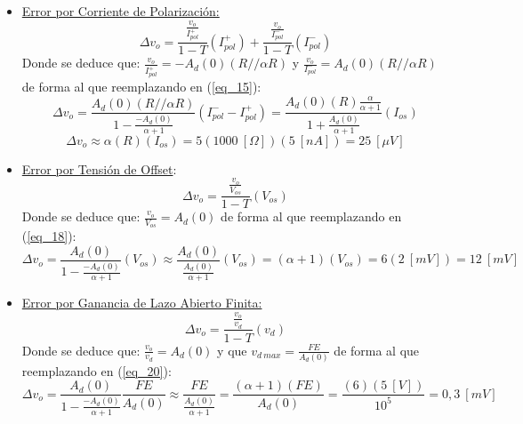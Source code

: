 \documentclass[12pt,a4paper]{article}
\begin{document}
\begin{itemize}
    \item \underline{Error por Corriente de Polarización:}
    \begin{equation}
        \label{eq_15}
        \Delta v_{o} = \frac{\frac{v_o}{I_{pol}^+}}{1-T}(I_{pol}^+) + \frac{\frac{v_o}{I_{pol}^-}}{1-T}(I_{pol}^-)
    \end{equation}
    Donde se deduce que: $\frac{v_o}{I_{pol}^+}=-A_{d}(0)(R//\alpha R)$ y $\frac{v_o}{I_{pol}^-}=A_{d}(0)(R//\alpha R)$ de forma al que reemplazando en (\ref{eq_15}):
    \begin{equation}
        \label{eq_16}
        \Delta v_{o} = \frac{A_{d}(0)(R//\alpha R)}{1-\frac{-A_{d}(0)}{\alpha+1}}(I_{pol}^- - I_{pol}^+) = \frac{A_{d}(0)(R)\frac{\alpha}{\alpha+1}}{1+\frac{A_{d}(0)}{\alpha+1}} (I_{os})
    \end{equation}
    \begin{equation}
        \label{eq_17}
        \Delta v_{o} \approx \alpha(R)(I_{os})=5(1000 \ [\Omega])(5 \ [nA]) = 25 \ [\mu V]
    \end{equation}
    
    \item \underline{Error por Tensión de Offset}:
    \begin{equation}
        \label{eq_18}
        \Delta v_{o} = \frac{\frac{v_o}{V_{os}}}{1-T}(V_{os})
    \end{equation}
    Donde se deduce que: $\frac{v_o}{V_{os}}=A_{d}(0)$ de forma al que reemplazando en (\ref{eq_18}):
    \begin{equation}
        \label{eq_19}
        \Delta v_{o} = \frac{A_{d}(0)}{1-\frac{-A_{d}(0)}{\alpha+1}}(V_{os}) \approx \frac{A_{d}(0)}{\frac{A_{d}(0)}{\alpha+1}}(V_{os})=(\alpha+1)(V_{os})=6(2 \ [mV]) = 12 \ [mV]
    \end{equation}

    \item \underline{Error por Ganancia de Lazo Abierto Finita:}
    \begin{equation}
        \label{eq_20}
        \Delta v_{o} = \frac{\frac{v_o}{v_{d}}}{1-T}(v_{d})
    \end{equation}
    Donde se deduce que: $\frac{v_o}{v_{d}}=A_{d}(0)$ y que $v_{d \ max}=\frac{FE}{A_{d}(0)}$ de forma al que reemplazando en (\ref{eq_20}):
    \begin{equation}
        \label{eq_21}
        \Delta v_{o} = \frac{A_{d}(0)}{1-\frac{-A_{d}(0)}{\alpha+1}} \frac{FE}{A_{d}(0)} \approx \frac{FE}{\frac{A_{d}(0)}{\alpha+1}}=\frac{(\alpha+1)(FE)}{A_{d}(0)}= \frac{(6)(5 \ [V])}{10^5} = 0,3 \ [mV]
    \end{equation}


\end{itemize}
\end{document}
